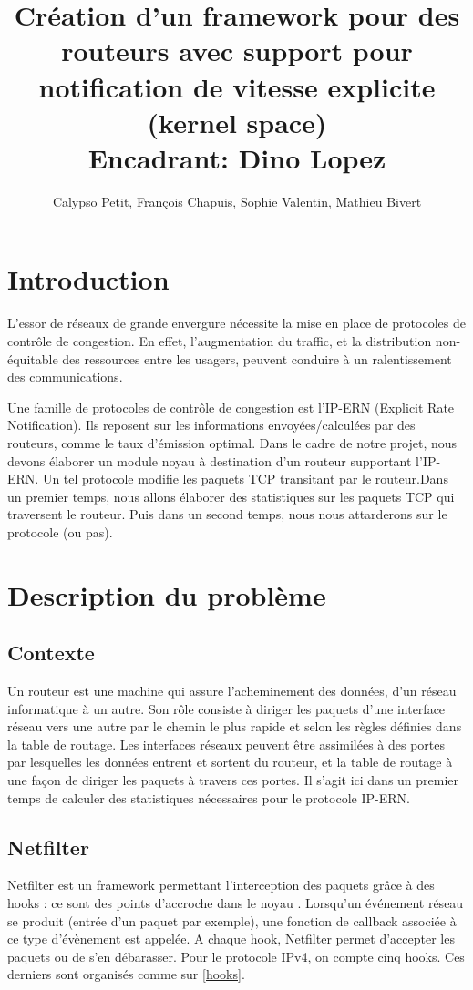 \documentclass[a4paper]{article}
\title{Création d'un framework pour des routeurs
	avec support pour notification de vitesse explicite
	(kernel space)\\Encadrant: Dino Lopez}
\author{Calypso Petit, François Chapuis, Sophie Valentin, Mathieu Bivert}
\begin{document}
\maketitle
\tableofcontents

\section{Introduction}
L'essor de réseaux de grande envergure nécessite la mise en
place de protocoles de contrôle de congestion. En effet,
l'augmentation du traffic, et la distribution non-équitable
des ressources entre les usagers, peuvent conduire à un
ralentissement des communications.

Une famille de protocoles de contrôle de congestion est l'IP-ERN
(Explicit Rate Notification). Ils reposent sur les informations
envoyées/calculées par des routeurs, comme le taux d'émission
optimal. Dans le cadre de notre projet, nous devons élaborer un
module noyau à destination d'un routeur supportant l'IP-ERN.
Un tel protocole modifie les paquets TCP transitant par le
routeur.Dans un premier temps, nous allons élaborer des statistiques
sur les paquets TCP qui traversent le routeur. Puis dans un
second temps, nous nous attarderons sur le protocole (ou pas).

\section{Description du problème}
\subsection{Contexte}
Un routeur est une machine qui assure l’acheminement des données,
d'un réseau informatique à un autre. Son rôle consiste à diriger
les paquets d'une interface réseau vers une autre par le chemin
le plus rapide et selon les règles définies dans la table de
routage. Les interfaces réseaux peuvent être assimilées à des
portes par lesquelles les données entrent et sortent du routeur, et
la table de routage à une façon de diriger les paquets à travers
ces portes. Il s'agit ici dans un premier temps de calculer
des statistiques nécessaires pour le protocole IP-ERN.

\subsection{Netfilter}
Netfilter est un framework permettant l'interception des paquets
grâce à des hooks : ce sont des points d'accroche dans le noyau \cite{netfilter1}.
Lorsqu'un événement réseau se produit (entrée d'un paquet par exemple),
une fonction de callback associée à ce type d'évènement est appelée.
A chaque hook, Netfilter permet d'accepter les paquets ou de s'en
débarasser. Pour le protocole IPv4, on compte cinq hooks. Ces derniers
sont organisés comme sur \ref{hooks}.
\end{document}

